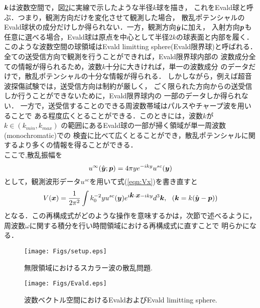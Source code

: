 $\mbox{\boldmath $k$}$は波数空間で，図\ref{fig:Evald}に実線で示したような半径$k$球を描き，
これをEvald球と呼ぶ．つまり，観測方向だけを変化させて観測した場合，
散乱ポテンシャルのEvald球状の成分だけしか得られない．一方，観測方向$\hat{\mbox{\boldmath $y$}}$に加え，
入射方向$\mbox{\boldmath $p$}$も任意に選べる場合，Evald球は原点を中心として半径$2k$の球表面と内部を履く．
このような波数空間の球領域はEvald limitting sphere(Evald限界球)と呼ばれる．
全ての送受信方向で観測を行うことができれば，Evald限界球内部の
波数成分全ての情報が得られるため，波数$k$十分に大きければ，単一の波数成分
のデータだけで，散乱ポテンシャルの十分な情報が得られる．
しかしながら，例えば超音波探傷試験では，送受信方向は制約が厳しく，
ごく限られた方向からの送受信しか行うことができないために，Evald限界球内の
一部のデータしか得られない．
一方で，送受信することのできる周波数帯域はパルスやチャープ波を用いることで
ある程度広くとることができる．このときには，波数$k$が$k\in \left(k_{min},k_{max} \right)$
の範囲にあるEvald球の一部が掃く領域が単一周波数(monochromatic)での
検査に比べて広くとることができ，散乱ポテンシャルに関するより多くの情報を得ることができる．
\\

ここで,散乱振幅を
\begin{equation}
	u^{\infty}(\hat{\mbox{\boldmath $y$}};\mbox{\boldmath $p$})=4\pi ye^{-iky} u^{sc}(\mbox{\boldmath $y$})
	\label{eqn:}
\end{equation}
として，観測波形データ$u^{sc}$を用いて式(\ref{eqn:Vx})を書き直すと
\begin{equation}
	V(\mbox{\boldmath $x$}) =\frac{1}{2\pi^2} \int k_0^{-2} yu^{sc}(\mbox{\boldmath $y$})
	e^{i\mbox{\boldmath $k$}\cdot \mbox{\boldmath $x$}-iky}d^3\mbox{\boldmath $k$}, 
	\ \ (\mbox{\boldmath $k$}=k(\hat{\mbox{\boldmath $y$}}-\mbox{\boldmath $p$}))
	\label{eqn:Vx_usc}
\end{equation}
となる．この再構成式がどのような操作を意味するかは，次節で述べるように，
周波数$\omega$に関する積分を行い時間領域における再構成式に直すことで
明らかになる．
\begin{figure}[h]
	\begin{center}
	\texttt{[image: Figs/setup.eps]} 
	\end{center}
	\caption{無限領域におけるスカラー波の散乱問題.} 
	\label{fig:}
\end{figure}
\begin{figure}[h]
	\begin{center}
	\texttt{[image: Figs/Evald.eps]} 
	\end{center}
	\caption{波数ベクトル空間におけるEvaldおよびEvald limitting sphere.} 
	\label{fig:Evald}
\end{figure}

